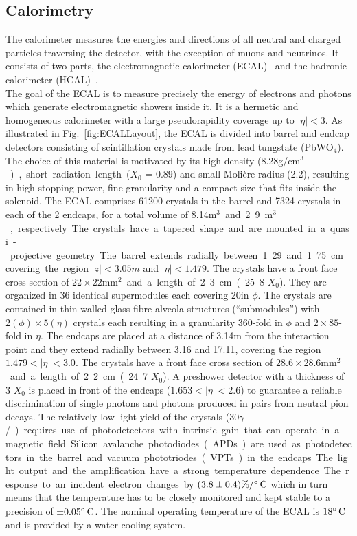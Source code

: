 \subsection{Calorimetry}

The calorimeter measures the energies and directions of all neutral and charged particles traversing the detector, with the exception of muons and neutrinos. It consists of two parts, the
electromagnetic calorimeter (ECAL)~\cite{ECALtdr} and the hadronic calorimeter (HCAL)~\cite{HCALtdr}.\\

The goal of the ECAL is to measure precisely the energy of electrons and photons which generate electromagnetic showers inside it. It is a hermetic and homogeneous calorimeter with a large pseudorapidity coverage up to $|\eta| < 3$. As illustrated in Fig.~\ref{fig:ECALLayout}, the ECAL is divided into barrel and endcap detectors consisting of scintillation crystals made from lead tungstate (PbWO$_4$). The choice of this material is motivated by its high density (8.28\unit{g/cm$^3$} ), short radiation length ($X_0$ = 0.89\cm) and small Moli\`{e}re radius (2.2\cm), resulting in high stopping power, fine granularity and a compact size that fits inside the solenoid.
The ECAL comprises 61200 crystals in the barrel and 7324 crystals in each of the 2 endcaps, for a total volume of 8.14\unit{m$^3$} and 2.9\unit{m$^3$}, respectively. The crystals have a tapered shape and are mounted in a quasi-projective geometry.
The barrel extends radially between 1.29 and 1.75\cm covering the region $|z| < 3.05\unit{m}$ and $|\eta| < 1.479$. The crystals have a front face cross-section of $22\times22$\unit{mm$^2$} and a length of 2.3\cm (25.8 $X_0$). They are organized in 36 identical supermodules each covering 20\de in $\phi$. The crystals are contained in thin-walled glass-fibre alveola structures (``submodules'') with $2(\phi)\times5(\eta)$ crystals each resulting in a granularity 360-fold in $\phi$ and $2\times85$-fold in $\eta$. The endcaps are placed at a distance of 3.14\unit{m} from the interaction point and they extend radially between 3.16 and 17.11\cm, covering the region $1.479 < |\eta| < 3.0$. The crystals have a front face cross section of $28.6\times28.6$\unit{mm$^2$} and a length of 2.2\cm (24.7 $X_0$). A preshower detector with a thickness of 3 $X_0$ is placed in front of the endcaps ($1.653 < |\eta| < 2.6$) to guarantee a reliable discrimination of single photons and photons produced in pairs from neutral pion decays.
The relatively low light yield of the crystals (30\unit{$\gamma$/\MeV}) requires use of photodetectors with intrinsic gain that can operate in a magnetic field. Silicon avalanche photodiodes (APDs) are used as photodetectors in the barrel and vacuum phototriodes (VPTs) in the endcaps. The light output and the amplification have a strong temperature dependence. The response to an incident electron changes by $(3.8\pm0.4)\%/^\circ\text{\,C}$ which in turn means that the temperature has to be closely monitored and kept stable to a precision of $\pm0.05^\circ\text{\,C}$. The nominal operating temperature of the ECAL is $18^\circ\text{\,C}$ and is provided by a water cooling system.

